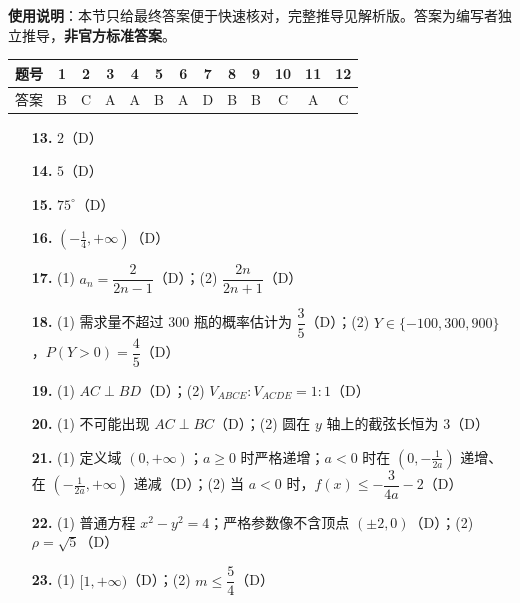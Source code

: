 
\begin{gknotice}
\textbf{使用说明}：本节只给最终答案便于快速核对，完整推导见解析版。答案为编写者独立推导，\textbf{非官方标准答案}。
\end{gknotice}

\begin{center}\begin{tabular}{ccccccccccccc}
\toprule
题号 & 1 & 2 & 3 & 4 & 5 & 6 & 7 & 8 & 9 & 10 & 11 & 12 \\
\midrule
答案 & B & C & A & A & B & A & D & B & B & C & A & C \\
\bottomrule
\end{tabular}\end{center}

\begin{itemize}[leftmargin=2.6em]
  \item[\textbf{13.}] \(2\)（D）
  \item[\textbf{14.}] \(5\)（D）
  \item[\textbf{15.}] \(75^\circ\)（D）
  \item[\textbf{16.}] \((-\tfrac14,+\infty)\)（D）
\end{itemize}

\begin{itemize}[leftmargin=2.6em]
  \item[\textbf{17.}] (1) \(a_n=\dfrac{2}{2n-1}\)（D）；(2) \(\dfrac{2n}{2n+1}\)（D）
  \item[\textbf{18.}] (1) 需求量不超过 300 瓶的概率估计为 \(\dfrac35\)（D）；(2) \(Y\in\{-100,300,900\}\)，\(P(Y>0)=\dfrac45\)（D）
  \item[\textbf{19.}] (1) \(AC\perp BD\)（D）；(2) \(V_{ABCE}:V_{ACDE}=1:1\)（D）
  \item[\textbf{20.}] (1) 不可能出现 \(AC\perp BC\)（D）；(2) 圆在 \(y\) 轴上的截弦长恒为 \(3\)（D）
  \item[\textbf{21.}] (1) 定义域 \((0,+\infty)\)；\(a\ge0\) 时严格递增；\(a<0\) 时在 \((0,-\tfrac1{2a})\) 递增、在 \((-\tfrac1{2a},+\infty)\) 递减（D）；(2) 当 \(a<0\) 时，\(f(x)\le-\dfrac3{4a}-2\)（D）
  \item[\textbf{22.}] (1) 普通方程 \(x^2-y^2=4\)；严格参数像不含顶点 \((\pm2,0)\)（D）；(2) \(\rho=\sqrt5\)（D）
  \item[\textbf{23.}] (1) \([1,+\infty)\)（D）；(2) \(m\le\dfrac54\)（D）
\end{itemize}
